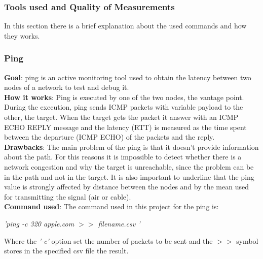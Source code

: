 \documentclass[a4paper,10pt]{article}
\begin{document}
 \begin{multicols}{2}
                
\subsubsection{Tools used and Quality of Measurements}
In this section there is a brief explanation about the used commands and how they works.

\subsubsection*{Ping}
\small\textbf{Goal}: ping is an active monitoring tool used to obtain the latency between two nodes of a network to test and debug it.\\
\small\textbf{How it works}: Ping is executed by one of the two nodes, the vantage point. During the execution, ping sends ICMP packets with variable payload
to the other, the target. When the target gets the packet it answer with an ICMP ECHO REPLY message and the latency (RTT) is measured as the time spent between the
departure (ICMP ECHO) of the packets and the reply.\\
\small\textbf{Drawbacks}: The main problem of the ping is that it doesn't provide information about the path. For this reasons it is impossible
to detect whether there is a network congestion and why the target is unreachable, since the problem can be in the path and not in the target. It is also important
to underline that the ping value is strongly affected by distance between the nodes and by the mean used for transmitting the signal (air or cable).\\
\small\textbf{Command used}: The command used in this project for the ping is: 
\begin{center}\textit{'ping  -c 320  apple.com  \(>>\)  filename.csv '} \end{center}
Where the \textit{'-c'} option set the number of packets to be sent and the \(>>\) symbol stores in the specified csv file the result.


\end{multicols}
\end{document}
